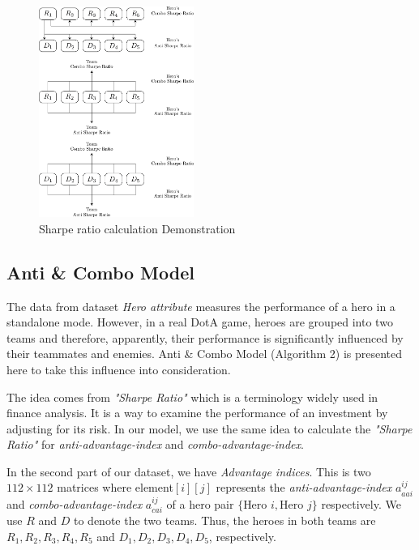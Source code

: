 \documentclass[letterpaper, 10 pt, conference]{ieeeconf}  %
\begin{document}
\begin{figure}[H]
\begin{center}
\includegraphics[width=0.45\textwidth]{sharpe_ratio.png}
\caption{Sharpe ratio calculation Demonstration}
\end{center}
\end{figure}

\subsection{Anti \& Combo Model}

The data from dataset \textit{Hero attribute} measures the performance of a hero in a standalone mode. However, in a real DotA game, heroes are grouped into two teams and therefore, apparently, their performance is significantly influenced by their teammates and enemies. Anti \& Combo Model (Algorithm 2) is presented here to take this influence into consideration.

The idea comes from \textit{"Sharpe Ratio"} which is a terminology widely used in finance analysis. It is a way to examine the performance of an investment by adjusting for its risk. In our model, we use the same idea to calculate the \textit{"Sharpe Ratio"} for \textit{anti-advantage-index} and \textit{combo-advantage-index}.

In the second part of our dataset, we have \textit{Advantage indices}. This is two $112 \times 112$ matrices where element$[i][j]$ represents the \textit{anti-advantage-index} $a_{aai}^{ij}$ and \textit{combo-advantage-index} $a_{cai}^{ij}$ of a hero pair $\{\text{Hero }i, \text{Hero }j\}$ respectively. We use $R$ and $D$ to denote the two teams. Thus, the heroes in both teams are ${R_1, R_2, R_3, R_4, R_5}$ and $D_1, D_2, D_3, D_4, D_5$, respectively. 
\end{document}
